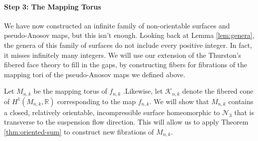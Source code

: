 \paragraph{Step 3: The Mapping Torus}

We have now constructed an infinite family of non-orientable surfaces and pseudo-Anosov maps, but this isn't
enough. Looking back at Lemma \ref{lem:genera}, the genera of this family of surfaces do not include every
positive integer. In fact, it misses infinitely many integers. We will use our extension of the Thurston's
fibered face theory to fill in the gaps, by constructing fibers for fibrations of the mapping tori of the
pseudo-Anosov maps we defined above.

Let $M_{n,k}$ be the mapping torus of $f_{n,k}$ .Likewise, let $\mathcal{K}_{n,k}$ denote the fibered cone of
$H^1(M_{n,k},\mathbb{R})$ corresponding to the map $f_{n,k}$. We will show that $M_{n,k}$ contains a closed,
relatively orientable, incompressible surface homeomorphic to $\mathcal{N}_3$ that is transverse to the
suspension flow direction. This will allow us to apply Theorem \ref{thm:oriented-sum} to construct
new fibrations of $M_{n,k}$.


